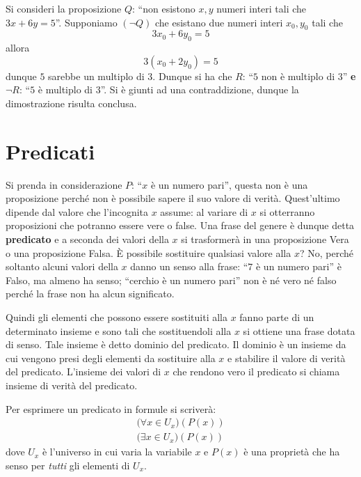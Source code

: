 \begin{example}
    Si consideri la proposizione \(Q\): ``non esistono \(x,y\) numeri interi tali che \(3x + 6y = 5\)''. Supponiamo \((\neg Q)\) che esistano due numeri interi \(x_0, y_0\) tali che 
    \[
        3x_0 + 6y_0 = 5
    \]
    allora
    \[
        3(x_0 + 2y_0) = 5
    \]
    dunque \(5\) sarebbe un multiplo di \(3\). Dunque si ha che \(R\): ``\(5\) non è multiplo di \(3\)'' \textbf{e} \(\neg R\): ``\(5\) è multiplo di \(3\)''. Si è giunti ad una contraddizione, dunque la dimostrazione risulta conclusa.
\end{example}


\section{Predicati}\label{sec:predicati}
Si prenda in considerazione \(P\): ``\(x\) è un numero pari'', questa non è una proposizione perché non è possibile sapere il suo valore di verità. Quest'ultimo dipende dal valore che l'incognita \(x\) assume: al variare di \(x\) si otterranno proposizioni che potranno essere vere o false. Una frase del genere è dunque detta \textbf{predicato} e a seconda dei valori della \(x\) si trasformerà in una proposizione Vera o una proposizione Falsa.
È possibile sostituire qualsiasi valore alla \(x\)? No, perché soltanto alcuni valori della \(x\) danno un senso alla frase: ``\(7\) è un numero pari'' è Falso, ma almeno ha senso; ``cerchio è un numero pari'' non è né vero né falso perché la frase non ha alcun significato.

Quindi gli elementi che possono essere sostituiti alla \(x\) fanno parte di un determinato insieme e sono tali che sostituendoli alla \(x\) si ottiene una frase dotata di senso. Tale insieme è detto dominio del predicato. Il dominio è un insieme da cui vengono presi degli elementi da sostituire alla \(x\) e stabilire il valore di verità del predicato.
L'insieme dei valori di \(x\) che rendono vero il predicato si chiama insieme di verità del predicato.

Per esprimere un predicato in formule si scriverà:
\begin{gather*}
    \big(\forall x \in U_x\big) \left(P(x)\right) \\
    \big(\exists x \in U_x\big) \left(P(x)\right)
\end{gather*}
dove \(U_x\) è l'universo in cui varia la variabile \(x\) e \(P(x)\) è una proprietà che ha senso per \emph{tutti} gli elementi di \(U_x\).

